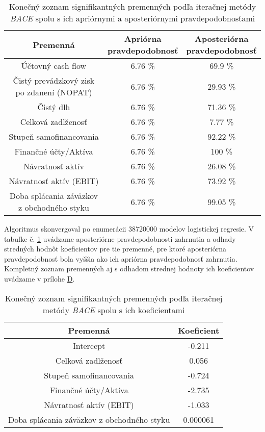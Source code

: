 \begin{table}
    \begin{tabular}{ |c|c|c| }
        \hline
        Premenná & \makecell{Apriórna \\ pravdepodobnosť} & \makecell{Aposteriórna \\ pravdepodobnosť} \\
        \hline
        Účtovný cash flow & 6.76 \% & 69.9 \% \\
        \hline
        Čistý prevádzkový zisk po zdanení (NOPAT) & 6.76 \% & 29.93 \% \\
        \hline
        Čistý dlh & 6.76 \% & 71.36 \% \\
        \hline
        Celková zadlženosť & 6.76 \% & 7.77 \% \\
        \hline
        Stupeň samofinancovania & 6.76 \% & 92.22 \% \\
        \hline
        Finančné účty/Aktíva & 6.76 \% & 100 \% \\
        \hline
        Návratnosť aktív & 6.76 \% & 26.08 \%\\
        \hline
        Návratnosť aktív (EBIT) & 6.76 \% & 73.92 \% \\
        \hline
        Doba splácania záväzkov z obchodného styku & 6.76 \% & 99.05 \% \\
        \hline
    \end{tabular}
    \caption{Konečný zoznam signifikantných premenných podľa iteračnej metódy \emph{BACE} spolu s ich apriórnymi a aposteriórnymi pravdepodobnosťami}
    \label{bace2 tabulka pp}
\end{table}

Algoritmus skonvergoval po enumerácii 38720000 modelov logistickej regresie.
V tabuľke č. \ref{bace2 tabulka pp} uvádzame aposteriórne pravdepodobnosti zahrnutia a odhady stredných hodnôt koeficientov pre tie premenné,
pre ktoré aposteriórna pravdepodobnosť bola vyššia ako ich apriórna pravdepodobnosť zahrnutia.
Kompletný zoznam premenných aj s odhadom strednej hodnoty ich koeficientov uvádzame v prílohe \hyperref[appendix:d]{D}.

\begin{table}
    \begin{tabular}{ |c|c| }
        \hline
        Premenná & Koeficient \\
        \hline
        Intercept & -0.211 \\
        \hline
        Celková zadlženosť & 0.056 \\
        \hline
        Stupeň samofinancovania & -0.724 \\
        \hline
        Finančné účty/Aktíva & -2.735 \\
        \hline
        Návratnosť aktív (EBIT) & -1.033 \\
        \hline
        Doba splácania záväzkov z obchodného styku & 0.000061 \\
        \hline
    \end{tabular}
    \caption{Konečný zoznam signifikantných premenných podľa iteračnej metódy \emph{BACE} spolu s ich koeficientami}
    \label{bace2 tabulka konecne parametre}
\end{table}


